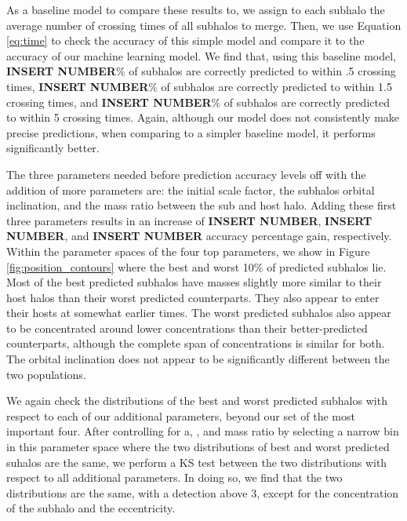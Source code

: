 \documentclass[fleqn,usenatbib]{mnras}
\newcommand\edits[1]{{\color{red}#1}}
\begin{document}
As a baseline model to compare these results to, we assign to each subhalo the average number of crossing times of all subhalos to merge. Then, we use Equation \ref{eq:time} to check the accuracy of this simple model and compare it to the accuracy of our machine learning model. We find that, using this baseline model, \edits{\textbf{INSERT NUMBER}\%} of subhalos are correctly predicted to within .5 crossing times, \edits{\textbf{INSERT NUMBER}\%} of subhalos are correctly predicted to within 1.5 crossing times, and \edits{\textbf{INSERT NUMBER}\%} of subhalos are correctly predicted to within 5 crossing times. Again, although our model does not consistently make precise predictions, when comparing to a simpler baseline model, it performs significantly better.

The three parameters needed before prediction accuracy levels off with the addition of more parameters are: the initial scale factor, the subhalos orbital inclination, and the mass ratio between the sub and host halo. Adding these first three parameters results in an increase of \edits{\textbf{INSERT NUMBER}}, \edits{\textbf{INSERT NUMBER}}, and  \edits{\textbf{INSERT NUMBER}} accuracy percentage gain, respectively. Within the parameter spaces of the four top parameters, we show in Figure \ref{fig:position_contours} where the best and worst 10\% of predicted subhalos lie. Most of the best predicted subhalos have masses slightly more similar to their host halos than their worst predicted counterparts. They also appear to enter their hosts at somewhat earlier times. The worst predicted subhalos also appear to be concentrated around lower concentrations than their better-predicted counterparts, although the complete span of concentrations is similar for both. The orbital inclination does not appear to be significantly different between the two populations.

We again check the distributions of the best and worst predicted subhalos with respect to each of our additional parameters, beyond our set of the most important four. After controlling for a, \texttheta, and mass ratio by selecting a narrow bin in this parameter space where the two distributions of best and worst predicted suhalos are the same, we perform a KS test between the two distributions with respect to all additional parameters. In doing so, we find that the two distributions are the same, with a detection above 3\textsigma, except for the concentration of the subhalo and the eccentricity.
\end{document}
